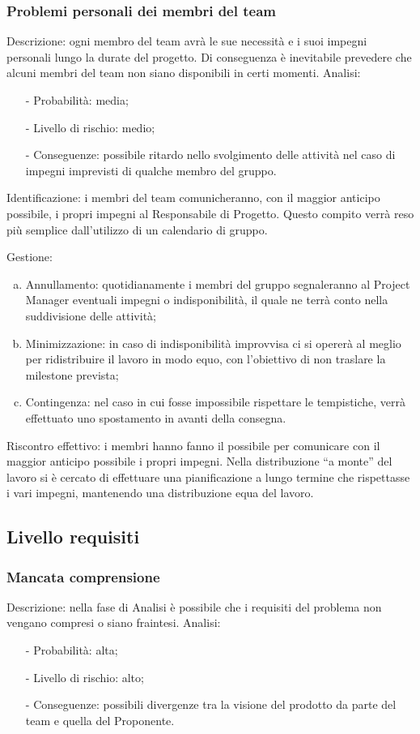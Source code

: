 \documentclass[../PianoProgetto.tex]{subfiles}
\begin{document}
\subsubsection{Problemi personali dei membri del team}
	Descrizione: ogni membro del team avrà le sue necessità e i suoi impegni personali lungo la durate del progetto. Di conseguenza è inevitabile prevedere che alcuni membri del team non siano disponibili in certi momenti. 
	Analisi:
	\begin{itemize}
		\item[-] Probabilità: media;
		\item[-] Livello di rischio: medio;
		\item[-] Conseguenze: possibile ritardo nello svolgimento delle attività nel caso di impegni imprevisti di qualche membro del gruppo.
	\end{itemize}	
		
	Identificazione: i membri del team comunicheranno, con il maggior anticipo possibile, i propri impegni al Responsabile di Progetto. Questo compito verrà reso più semplice dall’utilizzo di un calendario di gruppo. 
	
	Gestione:
	\begin{enumerate}[(a)]
		\item Annullamento: quotidianamente i membri del gruppo segnaleranno al Project Manager eventuali impegni o indisponibilità, il quale ne terrà conto nella suddivisione delle attività;
		\item Minimizzazione: in caso di indisponibilità improvvisa ci si opererà al meglio per ridistribuire il lavoro in modo equo, con l’obiettivo di non traslare la milestone prevista;
		\item  Contingenza: nel caso in cui fosse impossibile rispettare le tempistiche, verrà effettuato uno spostamento in avanti della consegna.
	\end{enumerate}		
	Riscontro effettivo: i membri hanno fanno il possibile per comunicare con il maggior anticipo possibile i propri impegni. Nella distribuzione “a monte” del lavoro si è cercato di effettuare una pianificazione a lungo termine che rispettasse i vari impegni, mantenendo una distribuzione equa del lavoro.


\subsection{Livello requisiti}

\subsubsection{Mancata comprensione}
	Descrizione: nella fase di Analisi è possibile che i requisiti del problema non vengano compresi o siano fraintesi.
	Analisi:
	\begin{itemize}
		\item[-] Probabilità: alta;
		\item[-] Livello di rischio: alto;
		\item[-] Conseguenze: possibili divergenze tra la visione del prodotto da parte del team e quella del Proponente.
	\end{itemize}	
		
\end{document}
